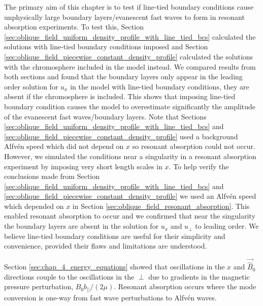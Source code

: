 The primary aim of this chapter is to test if line-tied boundary conditions cause unphysically large boundary layers/evanescent fast waves to form in resonant absorption experiments. To test this, Section \ref{sec:oblique_field_uniform_density_profile_with_line_tied_bcs} calculated the solutions with line-tied boundary conditions imposed and Section \ref{sec:oblique_field_piecewise_constant_density_profile} calculated the solutions with the chromosphere included in the model instead. We compared results from both sections and found that the boundary layers only appear in the leading order solution for $u_x$ in the model with line-tied boundary conditions, they are absent if the chromosphere is included.
This shows that imposing line-tied boundary condition causes the model to overestimate significantly the amplitude of the evanescent fast waves/boundary layers. Note that Sections \ref{sec:oblique_field_uniform_density_profile_with_line_tied_bcs} and \ref{sec:oblique_field_piecewise_constant_density_profile} used a background Alfv\'en speed which did not depend on $x$ so resonant absorption could not occur. However, we simulated the conditions near a singularity in a resonant absorption experiment by imposing very short length scales in $x$. To help verify the conclusions made from Section \ref{sec:oblique_field_uniform_density_profile_with_line_tied_bcs} and \ref{sec:oblique_field_piecewise_constant_density_profile} we used an Alfv\'en speed which depended on $x$ in Section \ref{sec:oblique_field_resonant_absorption}. This enabled resonant absorption to occur and we confirmed that near the singularity the boundary layers are absent in the solution for $u_x$ and $u_\perp$ to leading order. We believe line-tied boundary conditions are useful for their simplicity and convenience, provided their flaws and limitations are understood.

Section \ref{sec:chap_4_energy_equations} showed that oscillations in the $x$ and $\vec{\hat{B}}_0$ directions couple to the oscillations in the $\perp$ due to gradients in the magnetic pressure perturbation, $B_0b_{||}/(2\mu)$. Resonant absorption occurs where the mode conversion is one-way from fast wave perturbations to Alfv\'en waves. 

